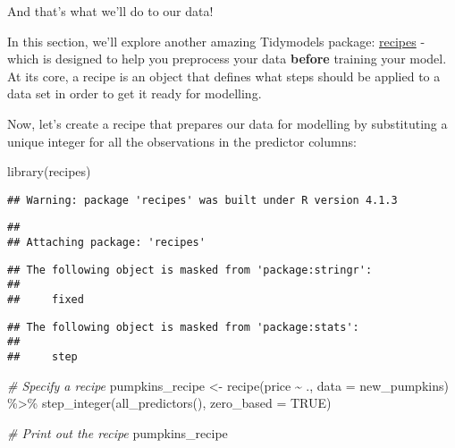 \documentclass[
]{article}
\newenvironment{Shaded}{\begin{snugshade}}{\end{snugshade}}
\newcommand{\AttributeTok}[1]{\textcolor[rgb]{0.77,0.63,0.00}{#1}}
\newcommand{\CommentTok}[1]{\textcolor[rgb]{0.56,0.35,0.01}{\textit{#1}}}
\newcommand{\ConstantTok}[1]{\textcolor[rgb]{0.00,0.00,0.00}{#1}}
\newcommand{\FunctionTok}[1]{\textcolor[rgb]{0.00,0.00,0.00}{#1}}
\newcommand{\NormalTok}[1]{#1}
\newcommand{\OtherTok}[1]{\textcolor[rgb]{0.56,0.35,0.01}{#1}}
\newcommand{\SpecialCharTok}[1]{\textcolor[rgb]{0.00,0.00,0.00}{#1}}
\begin{document}
And that's what we'll do to our data!

In this section, we'll explore another amazing Tidymodels package:
\href{https://tidymodels.github.io/recipes/}{recipes} - which is
designed to help you preprocess your data \textbf{before} training your
model. At its core, a recipe is an object that defines what steps should
be applied to a data set in order to get it ready for modelling.

Now, let's create a recipe that prepares our data for modelling by
substituting a unique integer for all the observations in the predictor
columns:

\begin{Shaded}
\begin{Highlighting}[]
\FunctionTok{library}\NormalTok{(recipes)}
\end{Highlighting}
\end{Shaded}

\begin{verbatim}
## Warning: package 'recipes' was built under R version 4.1.3
\end{verbatim}

\begin{verbatim}
## 
## Attaching package: 'recipes'
\end{verbatim}

\begin{verbatim}
## The following object is masked from 'package:stringr':
## 
##     fixed
\end{verbatim}

\begin{verbatim}
## The following object is masked from 'package:stats':
## 
##     step
\end{verbatim}

\begin{Shaded}
\begin{Highlighting}[]
\CommentTok{\# Specify a recipe}
\NormalTok{pumpkins\_recipe }\OtherTok{\textless{}{-}} \FunctionTok{recipe}\NormalTok{(price }\SpecialCharTok{\textasciitilde{}}\NormalTok{ ., }\AttributeTok{data =}\NormalTok{ new\_pumpkins) }\SpecialCharTok{\%\textgreater{}\%} 
  \FunctionTok{step\_integer}\NormalTok{(}\FunctionTok{all\_predictors}\NormalTok{(), }\AttributeTok{zero\_based =} \ConstantTok{TRUE}\NormalTok{)}


\CommentTok{\# Print out the recipe}
\NormalTok{pumpkins\_recipe}
\end{Highlighting}
\end{Shaded}
\end{document}
